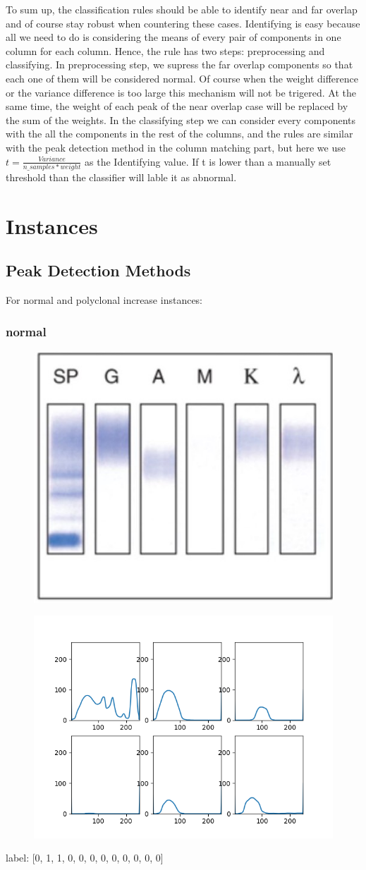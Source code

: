 \documentclass[12pt]{ctexart}
\begin{document}
\par To sum up, the classification rules should be able to identify near and far overlap and of course stay robust when countering these cases. Identifying is easy because all we need to do is considering the means of every pair of components in one column for each column. Hence, the rule has two steps: preprocessing and classifying. In preprocessing step, we supress the far overlap components so that each one of them will be considered normal. Of course when the weight difference or the variance difference is too large this mechanism will not be trigered. At the same time, the weight of each peak of the near overlap case will be replaced by the sum of the weights. In the classifying step we can consider every components with the all the components in the rest of the columns, and the rules are similar with the peak detection method in the column matching part, but here we use $t=\frac{Variance}{n\_samples*weight}$ as the Identifying value. If t is lower than a manually set threshold than the classifier will lable it as abnormal.
\section{Instances}
\subsection{Peak Detection Methods}
For normal and polyclonal increase instances:
\subsubsection{normal}
\begin{figure}[H]
    \centering
    \includegraphics[width=0.5\linewidth]{no.jpg}
\end{figure}
\begin{figure}[H]
    \centering
    \includegraphics[width=0.5\linewidth]{normal.png}
\end{figure}
label: [0, 1, 1, 0, 0, 0, 0, 0, 0, 0, 0, 0]
\end{document}
